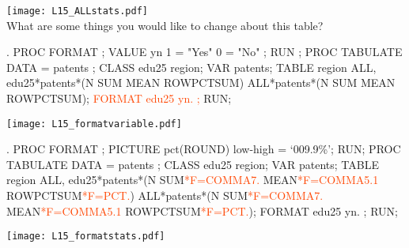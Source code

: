 \begin{frame}
\texttt{[image: L15\_ALLstats.pdf]}\\
\vskip10pt
\oyo What are some things you would like to change about this table?
\end{frame}

\begin{frame}[fragile]
\begin{code}{.}
PROC FORMAT ;  VALUE yn 1 = "Yes" 0 = "No" ; RUN ;
PROC TABULATE DATA = patents ;
   CLASS edu25 region;
   VAR patents;
   TABLE region ALL,
         edu25*patents*(N SUM MEAN ROWPCTSUM)
         ALL*patents*(N SUM MEAN ROWPCTSUM);
    \textcolor{OrangeRed}{FORMAT edu25 yn. ;}
RUN;
\end{code}
\emp
\vskip10pt
\texttt{[image: L15\_formatvariable.pdf]}\\
\end{frame}


\begin{frame}[fragile]
\hspace*{-0.3in}
\begin{code}{.}
PROC FORMAT ;  PICTURE pct(ROUND) low-high = `009.9\%';  RUN;
PROC TABULATE DATA = patents ;
   CLASS edu25 region;
   VAR patents;
   TABLE region ALL,
   edu25*patents*(N SUM\textcolor{OrangeRed}{*F=COMMA7.} MEAN\textcolor{OrangeRed}{*F=COMMA5.1} ROWPCTSUM\textcolor{OrangeRed}{*F=PCT.})
   ALL*patents*(N SUM\textcolor{OrangeRed}{*F=COMMA7.} MEAN\textcolor{OrangeRed}{*F=COMMA5.1} ROWPCTSUM\textcolor{OrangeRed}{*F=PCT.});
   FORMAT edu25 yn. ;
RUN;
\end{code}
\emp
\vskip10pt
\texttt{[image: L15\_formatstats.pdf]}\\
\end{frame}


